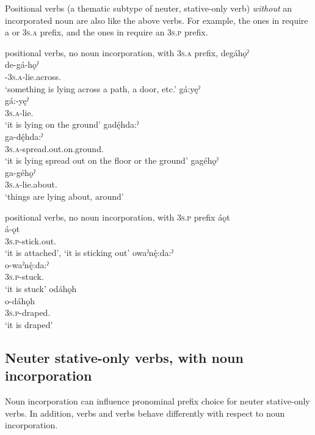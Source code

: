 Positional verbs (a thematic subtype of neuter, stative-only verb) \emph{without} an incorporated noun are also like the above verbs. For example, the ones in  require a  or  \textsc{3s.a} prefix, and the ones in  require an  \textsc{3s.p} prefix.

\ea\label{ex:positppchoiceex2} positional verbs, no noun incorporation, with  \textsc{3s.a} prefix,
\ea degáhǫˀ\\
\gll de-gá-hǫˀ\\
 {\dualic}-\textsc{3s.a}-lie.across.{\stative}\\
\glt `something is lying across a path, a door, etc.'
\ex gá:yęˀ\\
\gll gá:-yęˀ\\
 \textsc{3s.a}-lie.{\stative}\\
\glt `it is lying on the ground'
\ex gadę́hda:ˀ\\
\gll ga-dę́hda:ˀ\\
 \textsc{3s.a}-spread.out.on.ground.{\stative}\\
\glt `it is lying spread out on the floor or the ground'
\ex gagéhǫˀ\\
\gll ga-géhǫˀ\\
 \textsc{3s.a}-lie.about. {\stative}\\
\glt `things are lying about, around'
\z
\z

\ea\label{ex:positppchoiceex3} positional verbs, no noun incorporation, with  \textsc{3s.p} prefix
\ea áǫt \\
\gll á-ǫt\\
 \textsc{3s.p}-stick.out.{\stative}\footnotemark{}\\
\glt ‘it is attached’, `it is sticking out'
\ex owaˀnę́:da:ˀ\\
\gll o-waˀnę́:da:ˀ\\
 \textsc{3s.p}-stuck.{\stative}\\
\glt `it is stuck'
\ex odáhǫh\\
\gll o-dáhǫh\\
 \textsc{3s.p}-draped.{\stative}\\
\glt `it is draped'
\z
\z

\subsection{Neuter stative-only verbs, with noun incorporation} \label{Neuter stative-only verbs, with noun incorporation}
Noun incorporation can influence pronominal prefix choice for neuter stative-only verbs. In addition,  verbs and  verbs behave differently with respect to noun incorporation.

